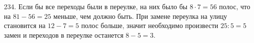 234. Если бы все переходы были в переулке, на них было бы $8\cdot7=56$ полос, что на $81-56=25$ меньше, чем должно быть. При замене переулка на улицу становится на $12-7=5$ полос больше, значит необходимо произвести $25:5=5$ замен и переходов в переулке останется $8-5=3.$\\
